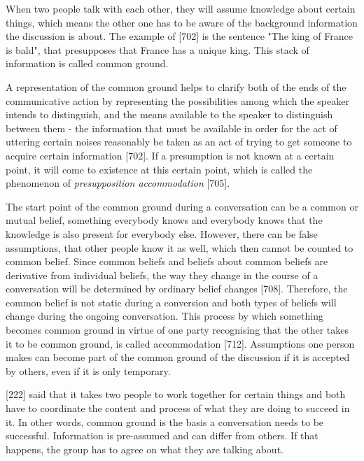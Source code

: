 When two people talk with each other, they will assume knowledge about certain things, which means the other one has to be aware of the background information the discussion is about. The example of \textcite{Stalnaker2002CommonGround}[702] is the sentence "The king of France is bald", that presupposes that France has a unique king. This stack of information is called common ground. 

A representation of the common ground helps to clarify both of the ends of the communicative action by representing the possibilities among which the speaker intends to distinguish, and the means available to the speaker to distinguish between them - the information that must be available in order for the act of uttering certain noises reasonably be taken as an act of trying to get someone to acquire certain information \autocite{Stalnaker2002CommonGround}[702].
If a presumption is not known at a certain point, it will come to existence at this certain point, which is called the phenomenon of \textit{presupposition accommodation} \autocite{Stalnaker2002CommonGround}[705].

The start point of the common ground during a conversation can be a common or mutual belief, something everybody knows and everybody knows that the knowledge is also present for everybody else. However, there can be false assumptions, that other people know it as well, which then cannot be counted to common belief.
Since common beliefs and beliefs about common beliefs are derivative from individual beliefs, the way they change in the course of a conversation will be determined by ordinary belief changes \autocite{Stalnaker2002CommonGround}[708].
Therefore, the common belief is not static during a conversion and both types of beliefs will change during the ongoing conversation. This process by which something becomes common ground in virtue of one party recognising that the other takes it to be common ground, is called accommodation \autocite{Stalnaker2002CommonGround}[712]. 
Assumptions one person makes can become part of the common ground of the discussion if it is accepted by others, even if it is only temporary.


\textcite{Clark2004GroundingCommunication.}[222] said that it takes two people to work together for certain things and both have to coordinate the content and process of what they are doing to succeed in it.
In other words, common ground is the basis a conversation needs to be successful. Information is pre-assumed and can differ from others. If that happens, the group has to agree on what they are talking about.  


